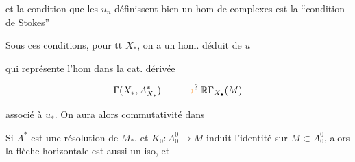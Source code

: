 
et la condition que les $u_n$ définissent bien un hom de complexes est la ``condition de Stokes''


Sous ces conditions, pour tt $X_*$, on a un hom.  déduit de $u$


qui représente l'hom dans la cat. dérivée

\[
\Gamma(X_*,A^*_{X_*})\mathrel{\unsure{\relbar|\longrightarrow}}\mathbb{R}\Gamma_{X_\bullet}(M)
\]

associé à $u_*$. On aura alors commutativité dans


Si $A^{*}$ est une résolution de $M_*$, et $K_0:A_0^0\longrightarrow M$ induit l'identité sur $M\subset A^0_0$, alors la  flèche horizontale est aussi un iso, et

